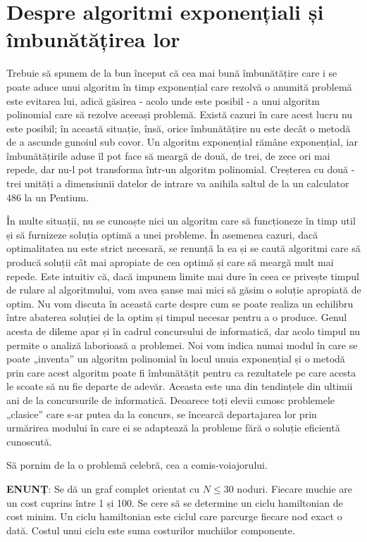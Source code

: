 \chapter{Despre algoritmi exponențiali și îmbunătățirea lor}

Trebuie să spunem de la bun început că cea mai bună îmbunătățire care i se
poate aduce unui algoritm în timp exponențial care rezolvă o anumită problemă
este evitarea lui, adică găsirea - acolo unde este posibil - a unui algoritm
polinomial care să rezolve aceeași problemă. Există cazuri în care acest lucru
nu este posibil; în această situație, însă, orice îmbunătățire nu este decât o
metodă de a ascunde gunoiul sub covor. Un algoritm exponențial rămâne
exponențial, iar îmbunătățirile aduse îl pot face să meargă de două, de trei,
de zece ori mai repede, dar nu-l pot transforma într-un algoritm
polinomial. Creșterea cu două - trei unități a dimensiunii datelor de intrare
va anihila saltul de la un calculator 486 la un Pentium.

În multe situații, nu se cunoaște nici un algoritm care să funcționeze în timp
util și să furnizeze soluția optimă a unei probleme. În asemenea cazuri, dacă
optimalitatea nu este strict necesară, se renunță la ea și se caută algoritmi
care să producă soluții cât mai apropiate de cea optimă și care să meargă mult
mai repede. Este intuitiv că, dacă impunem limite mai dure în ceea ce privește
timpul de rulare al algoritmului, vom avea șanse mai mici să găsim o soluție
apropiată de optim. Nu vom discuta în această carte despre cum se poate
realiza un echilibru între abaterea soluției de la optim și timpul necesar
pentru a o produce. Genul acesta de dileme apar și în cadrul concursului de
informatică, dar acolo timpul nu permite o analiză laborioasă a problemei. Noi
vom indica numai modul în care se poate „inventa” un algoritm polinomial în
locul unuia exponențial și o metodă prin care acest algoritm poate fi
îmbunătățit pentru ca rezultatele pe care acesta le scoate să nu fie departe
de adevăr. Aceasta este una din tendințele din ultimii ani de la concursurile
de informatică. Deoarece toți elevii cunosc problemele „clasice” care s-ar
putea da la concurs, se încearcă departajarea lor prin urmărirea modului în
care ei se adaptează la probleme fără o soluție eficientă cunoscută.

Să pornim de la o problemă celebră, cea a comis-voiajorului.

{\bf ENUNȚ}: Se dă un graf complet orientat cu $N \leq 30$ noduri. Fiecare
muchie are un cost cuprins între 1 și 100. Se cere să se determine un ciclu
hamiltonian de cost minim. Un ciclu hamiltonian este ciclul care parcurge
fiecare nod exact o dată. Costul unui ciclu este suma costurilor muchiilor
componente.

